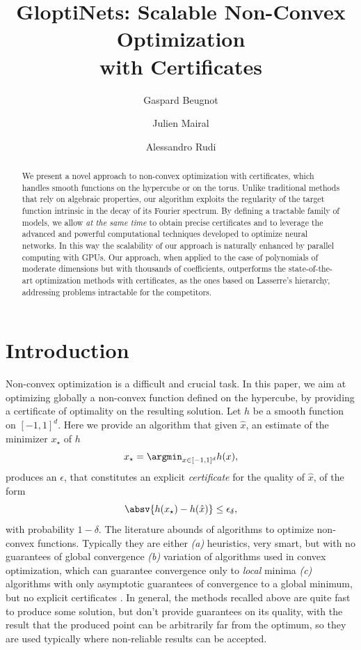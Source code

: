 \documentclass{article}
\title{GloptiNets: Scalable Non-Convex Optimization \\ with Certificates}
\author[1]{Gaspard Beugnot}
\author[2]{Julien Mairal}
\author[1]{Alessandro Rudi}
\affil[1]{Inria, \'Ecole normale sup\'erieure, CNRS, PSL Research Univ., 75005 Paris, France}
\affil[2]{Univ. Grenoble Alpes, Inria, CNRS, Grenoble INP, LJK, 38000 Grenoble, France}
\date{}
\begin{document}
\maketitle

\begin{abstract}

  We present a novel approach to non-convex optimization with certificates, which handles smooth functions on the hypercube or on the torus. Unlike traditional methods that rely on algebraic properties, our algorithm exploits the regularity of the target function intrinsic in the decay of its Fourier spectrum. By defining a tractable family of models, we allow {\em at the same time} to obtain precise certificates and to leverage the advanced and powerful computational techniques developed to optimize neural networks. In this way the scalability of our approach is naturally enhanced by parallel computing with GPUs. Our approach, when applied to the case of polynomials of moderate dimensions but with thousands of coefficients, outperforms the state-of-the-art optimization methods with certificates, as the ones based on Lasserre's hierarchy, addressing problems intractable for the competitors.
\end{abstract}

\section{Introduction}

Non-convex optimization is a difficult and crucial task. In this paper, we aim at optimizing globally a non-convex function defined on the hypercube, by providing a certificate of optimality on the resulting solution. Let $h$ be a smooth function on $[-1,1]^d$. Here we provide an algorithm that given $\hat{x}$, an estimate of the minimizer $x_\star$ of $h$
\begin{equation*}
  x_\star = \argmin_{x \in [-1,1]^d} h(x),
\end{equation*}
produces an $\epsilon$, that constitutes an explicit {\em certificate} for the quality of $\widehat{x}$, of the form
\begin{equation*}
  \absv{h(x_\star) - h(\hat{x})} \leq \epsilon_\delta,
\end{equation*}
with probability $1-\delta$.
The literature abounds of algorithms to optimize non-convex functions. Typically they are either \emph{(a)} heuristics, very smart, but with no guarantees of global convergence \cite{moscato1989evolution,horst2013handbook} \emph{(b)} variation of algorithms used in convex optimization, which can guarantee convergence only to {\em local} minima \cite{boyd2004convex} \emph{(c)} algorithms with only asymptotic guarantees of convergence to a global minimum, but no explicit certificates \cite{van1987simulated}. In general, the methods recalled above are quite fast to produce some solution, but don't provide guarantees on its quality, with the result that the produced point can be arbitrarily far from the optimum, so they are used typically where non-reliable results can be accepted.
\end{document}
